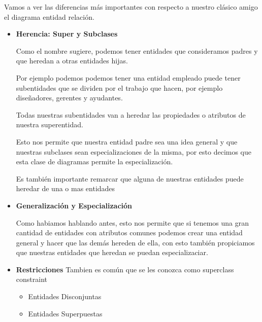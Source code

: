 \documentclass[12pt, fleqn]{report}                             %
\begin{document}
            Vamos a ver las diferencias más importantes con respecto a nuestro clásico amigo
            el diagrama entidad relación.

            \begin{itemize}
                \item
                    \textbf{Herencia: Super y Subclases}

                    Como el nombre sugiere, podemos tener entidades que consideramos padres
                    y que heredan a otras entidades hijas.

                    Por ejemplo podemos podemos tener una entidad empleado puede tener
                    subentidades que se dividen por el trabajo que hacen, por ejemplo
                    diseñadores, gerentes y ayudantes.

                    Todas nuestras subentidades van a heredar las propiedades o atributos
                    de nuestra superentidad.

                    Esto nos permite que nuestra entidad padre sea una idea general y que
                    nuestras subclases sean especializaciones de la misma, por esto decimos
                    que esta clase de diagramas permite la especialización.


                    Es también importante remarcar que alguna de nuestras entidades
                    puede heredar de una o mas entidades


                \item
                    \textbf{Generalización y Especialización}

                    Como habiamos hablando antes, esto nos permite que si tenemos
                    una gran cantidad de entidades con atributos comunes podemos 
                    crear una entidad general y hacer que las demás hereden de ella,
                    con esto también propiciamos que nuestras entidades que heredan 
                    se puedan especializaciar.


                \item
                    \textbf{Restricciones}
                        Tambien es común que se les conozca como superclass constraint

                        \begin{itemize}
                            \item Entidades Disconjuntas
                            \item Entidades Superpuestas
                        \end{itemize}


\end{itemize}
\end{document}
